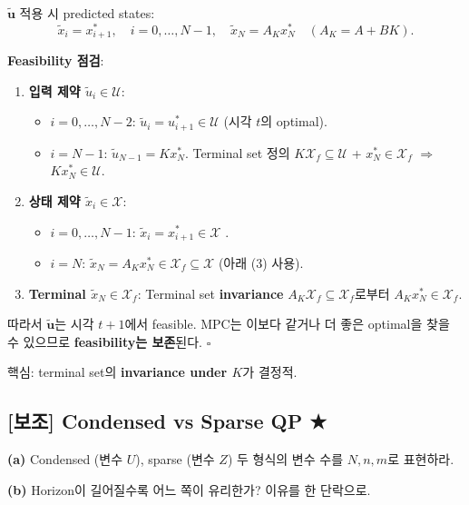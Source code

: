 \documentclass[11pt,a4paper]{article}
\begin{document}
\begin{sol}
$\tilde{\mathbf{u}}$ 적용 시 predicted states:
\[
\tilde x_i = x_{i+1}^*,\quad i = 0, \ldots, N - 1,\quad \tilde x_N = A_K x_N^*\quad (A_K = A + BK).
\]

\textbf{Feasibility 점검}:
\begin{enumerate}
  \item \textbf{입력 제약 $\tilde u_i \in \mathcal{U}$}:
    \begin{itemize}
      \item $i = 0, \ldots, N - 2$: $\tilde u_i = u_{i+1}^* \in \mathcal{U}$ (시각 $t$의 optimal). \checkmark
      \item $i = N - 1$: $\tilde u_{N-1} = K x_N^*$. Terminal set 정의 $K\mathcal{X}_f \subseteq \mathcal{U}$ + $x_N^* \in \mathcal{X}_f$ $\Rightarrow$ $K x_N^* \in \mathcal{U}$. \checkmark
    \end{itemize}

  \item \textbf{상태 제약 $\tilde x_i \in \mathcal{X}$}:
    \begin{itemize}
      \item $i = 0, \ldots, N - 1$: $\tilde x_i = x_{i+1}^* \in \mathcal{X}$ \checkmark.
      \item $i = N$: $\tilde x_N = A_K x_N^* \in \mathcal{X}_f \subseteq \mathcal{X}$ (아래 (3) 사용). \checkmark
    \end{itemize}

  \item \textbf{Terminal $\tilde x_N \in \mathcal{X}_f$}: Terminal set \textbf{invariance} $A_K \mathcal{X}_f \subseteq \mathcal{X}_f$로부터 $A_K x_N^* \in \mathcal{X}_f$. \checkmark
\end{enumerate}

따라서 $\tilde{\mathbf{u}}$는 시각 $t+1$에서 feasible. MPC는 이보다 같거나 더 좋은 optimal을 찾을 수 있으므로 \textbf{feasibility는 보존}된다. \hfill$\square$

핵심: terminal set의 \textbf{invariance under $K$}가 결정적.
\end{sol}

\subsection*{[보조] Condensed vs Sparse QP \hfill ★}

\begin{prob}
\textbf{(a)} Condensed (변수 $U$), sparse (변수 $Z$) 두 형식의 변수 수를 $N, n, m$로 표현하라.

\textbf{(b)} Horizon이 길어질수록 어느 쪽이 유리한가? 이유를 한 단락으로.
\end{prob}
\end{document}
